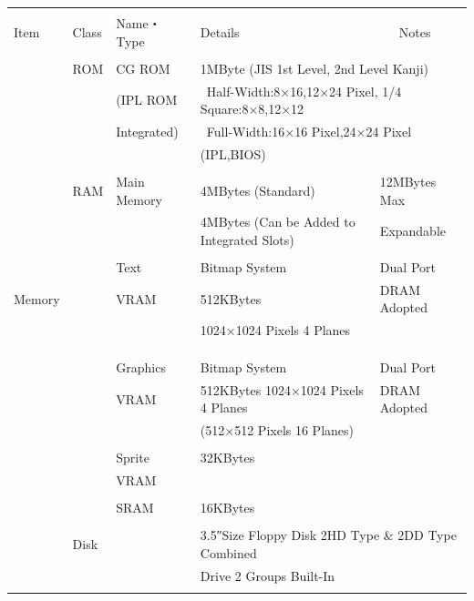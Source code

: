 ﻿\documentclass[twoside,a4paper,12pt]{article}
\begin{document}
\setlength{\tabcolsep}{0.5mm}
\begin{tabular}{|p{17mm}|p{13mm}|p{23mm}|p{80mm}|p{30mm}|}
\hline
& & & &\\[-2mm]
Item & Class & Name・Type & Details & \ \ \ Notes\\[1mm]
\hline
& & & \multicolumn{2}{l|}{}\\[-3mm]
& ROM & CG ROM & \multicolumn{2}{l|}{1MByte (JIS 1st Level, 2nd Level Kanji)}\\
& & (IPL ROM & \multicolumn{2}{l|}{\ Half-Width:8×16,12×24 Pixel, 1/4 Square:8×8,12×12}\\
& & Integrated) & \multicolumn{2}{l|}{\ Full-Width:16×16 Pixel,24×24 Pixel}\\
& & & \multicolumn{2}{l|}{(IPL,BIOS)}\\
\cline{2-5}
& & & &\\[-3mm]
& RAM & Main Memory & 4MBytes (Standard) & 12MBytes Max\\
& & & 4MBytes (Can be Added to Integrated Slots) & Expandable\\
\cline{3-5}
& & & &\\[-3mm]
& & Text & Bitmap System & Dual Port\\
Memory & & VRAM & 512KBytes & DRAM Adopted\\
& & & 1024×1024 Pixels 4 Planes &\\
& & & &\\
& & & &\\
\cline{3-5}
& & & &\\[-3mm]
& & Graphics & Bitmap System & Dual Port\\
& & VRAM & 512KBytes 1024×1024 Pixels 4 Planes & DRAM Adopted\\
& & & (512×512 Pixels 16 Planes) &\\
\cline{3-5}
& & & \multicolumn{2}{l|}{}\\[-3mm]
& & Sprite & \multicolumn{2}{l|}{32KBytes}\\
& & VRAM & \multicolumn{2}{l|}{}\\
\cline{3-5}
& & & \multicolumn{2}{l|}{}\\[-3mm]
& & SRAM & \multicolumn{2}{l|}{16KBytes}\\
\hline
& \multicolumn{4}{l|}{}\\[-3mm]
& \multicolumn{2}{l}{Disk} & \multicolumn{2}{l|}{3.5″Size Floppy Disk 2HD Type \& 2DD Type Combined}\\
& \multicolumn{2}{l}{} & \multicolumn{2}{l|}{Drive 2 Groups Built-In}\\
& \multicolumn{4}{l|}{}\\

\end{tabular}
\end{document}
